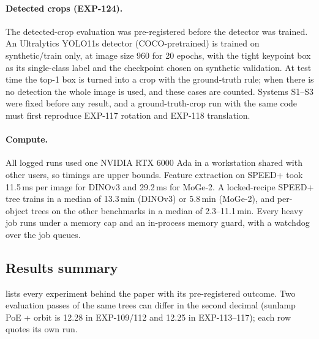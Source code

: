 \paragraph{Detected crops (EXP-124).}
The detected-crop evaluation was pre-registered before the detector was trained. An Ultralytics YOLO11s detector (COCO-pretrained) is trained on synthetic/train only, at image size 960 for 20 epochs, with the tight keypoint box as its single-class label and the checkpoint chosen on synthetic validation. At test time the top-1 box is turned into a crop with the ground-truth rule; when there is no detection the whole image is used, and these cases are counted. Systems S1--S3 were fixed before any result, and a ground-truth-crop run with the same code must first reproduce EXP-117 rotation and EXP-118 translation.

\paragraph{Compute.}
All logged runs used one NVIDIA RTX 6000 Ada in a workstation shared with other users, so timings are upper bounds. Feature extraction on SPEED+ took 11.5\,ms per image for DINOv3 and 29.2\,ms for MoGe-2. A locked-recipe SPEED+ tree trains in a median of 13.3\,min (DINOv3) or 5.8\,min (MoGe-2), and per-object trees on the other benchmarks in a median of 2.3--11.1\,min. Every heavy job runs under a memory cap and an in-process memory guard, with a watchdog over the job queues.

\subsection{Results summary}\label{app:z_results}\label{app:results}

 lists every experiment behind the paper with its pre-registered outcome. Two evaluation passes of the same trees can differ in the second decimal (\eg sunlamp PoE + orbit is 12.28 in EXP-109/112 and 12.25 in EXP-113--117); each row quotes its own run.


